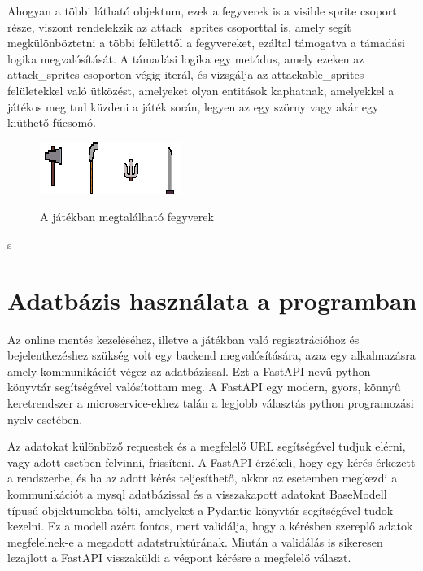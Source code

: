 Ahogyan a többi látható objektum, ezek a fegyverek is a visible sprite csoport része, viszont rendelekzik az attack\_sprites csoporttal is, amely segít megkülönböztetni a többi felülettől a fegyvereket, ezáltal támogatva a támadási logika megvalósítását. A támadási logika egy metódus, amely ezeken az attack\_sprites csoporton végig iterál, és vizsgálja az attackable\_sprites felületekkel való ütközést, amelyeket olyan entitások kaphatnak, amelyekkel a játékos meg tud küzdeni a játék során, legyen az egy szörny vagy akár egy kiüthető fűcsomó.  

\begin{figure}[H]
    \centering
    \includegraphics[width=15.5truecm]{images/weapons.png}
    \caption{A játékban megtalálható fegyverek}
    \label{fig:A játékban megtalálható fegyverek}\cite{weapons}
\end{figure}
s

\section{Adatbázis használata a programban}

\indent \indent Az online mentés kezeléséhez, illetve a játékban való regisztrációhoz és bejelentkezéshez szükség volt egy backend megvalósítására, azaz egy alkalmazásra amely kommunikációt végez az adatbázissal. Ezt a FastAPI nevű python könyvtár segítségével valósítottam meg. A FastAPI egy modern, gyors, könnyű keretrendszer a microservice-ekhez talán a legjobb választás python programozási nyelv esetében.

Az adatokat különböző requestek és a megfelelő URL segítségével tudjuk elérni, vagy adott esetben felvinni, frissíteni. A FastAPI érzékeli, hogy egy kérés érkezett a rendszerbe, és ha az adott kérés teljesíthető, akkor az esetemben megkezdi a kommunikációt a mysql adatbázissal és a visszakapott adatokat BaseModell típusú objektumokba tölti, amelyeket a Pydantic könyvtár segítségével tudok kezelni. Ez a modell azért fontos, mert validálja, hogy a kérésben szereplő adatok megfelelnek-e a megadott adatstruktúrának. Miután a validálás is sikeresen lezajlott a FastAPI visszaküldi a végpont kérésre a megfelelő választ.

